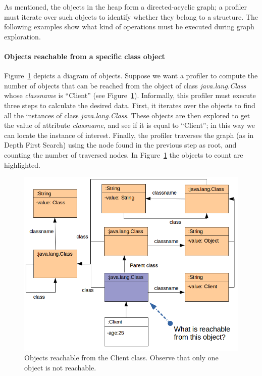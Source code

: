 
As mentioned, the objects in the heap form a directed-acyclic graph; a profiler must iterate over such objects to identify whether they belong to a structure.
The following examples show what kind of operations must be executed during graph exploration.

\paragraph{Objects reachable from a specific class object}

Figure~\ref{fig:reachable-from-class-object} depicts a diagram of objects.
Suppose we want a profiler to compute the number of objects that can be reached from the object of class \textit{java.lang.Class} whose \textit{classname} is ``Client'' (see Figure~\ref{fig:reachable-from-class-object}).
Informally, this profiler must execute three steps to calculate the desired data.
First, it iterates over the objects to find all the instances of class \textit{java.lang.Class}.
These objects are then explored to get the value of attribute \textit{classname}, and see if it is equal to ``Client''; in this way we can locate the instance of interest.
Finally, the profiler traverses the graph (as in Depth First Search) using the node found in the previous step as root, and counting the number of traversed nodes.
In Figure~\ref{fig:reachable-from-class-object} the objects to count are highlighted.

\begin{figure}[!ht]
\centering
\includegraphics[scale=0.5]{./chapter6/fig/example1.png}
\caption{Objects reachable from the Client class. Observe that only one object is not reachable.}\label{fig:reachable-from-class-object}
\end{figure}

